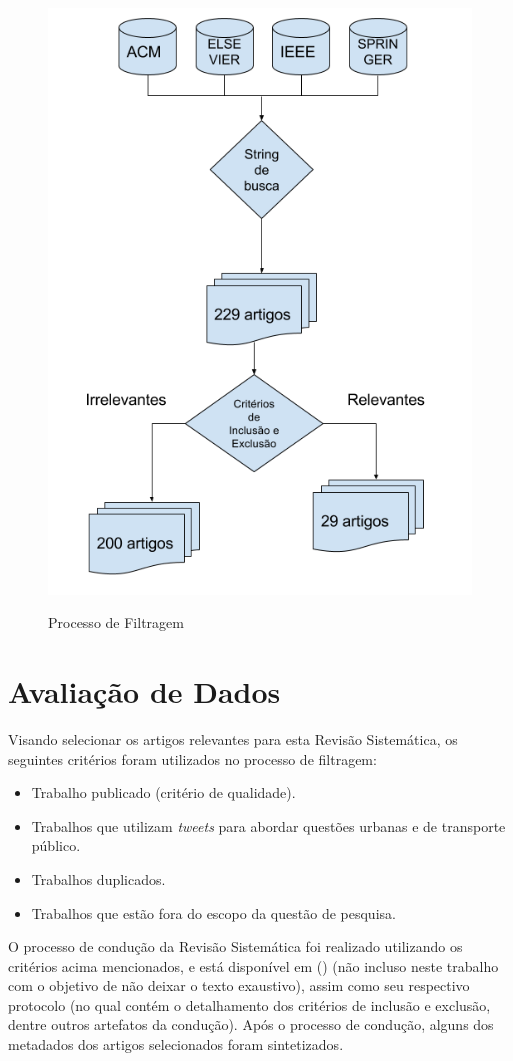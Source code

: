 \documentclass[
	12pt,				%
	oneside,			%
	a4paper,			%
	english,			%
	brazil				%
	]{abntex2ppgsi}
\begin{document}
{{\begin{figure}[H]%
	\centering
 	  \caption{Processo de Filtragem}
		\includegraphics[width=0.5\linewidth]{images/metodologia_metodologia.png}
	\label{fig:filter}
\end{figure}

\section{Avaliação de Dados}
\label{avaliacao}

Visando selecionar os artigos relevantes para esta Revisão Sistemática, os seguintes critérios foram utilizados no processo de filtragem:

\begin{itemize}
\item Trabalho publicado (critério de qualidade).
\item Trabalhos que utilizam \textit{tweets} para abordar questões urbanas e de transporte público.
\item Trabalhos duplicados.
\item Trabalhos que estão fora do escopo da questão de pesquisa.
\end{itemize}

O processo de condução da Revisão Sistemática foi realizado utilizando os critérios acima mencionados, e está disponível em \citeauthor{fcas} (\citeyear{fcas}) (não incluso neste trabalho com o objetivo de não deixar o texto exaustivo), assim como seu respectivo protocolo (no qual contém o detalhamento dos critérios de inclusão e exclusão, dentre outros artefatos da condução). Após o processo de condução, alguns dos metadados dos artigos selecionados foram sintetizados.

}}
\end{document}
